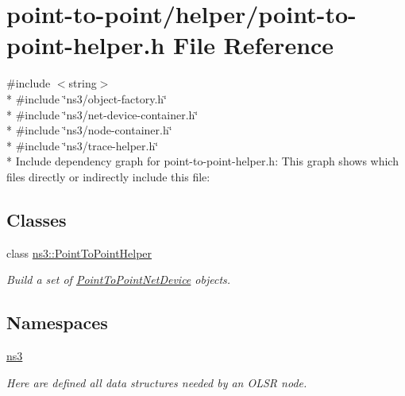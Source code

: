 \hypertarget{point-to-point-helper_8h}{}\section{point-\/to-\/point/helper/point-\/to-\/point-\/helper.h File Reference}
\label{point-to-point-helper_8h}
{\ttfamily \#include $<$string$>$}\\*
{\ttfamily \#include \char`\"{}ns3/object-\/factory.\+h\char`\"{}}\\*
{\ttfamily \#include \char`\"{}ns3/net-\/device-\/container.\+h\char`\"{}}\\*
{\ttfamily \#include \char`\"{}ns3/node-\/container.\+h\char`\"{}}\\*
{\ttfamily \#include \char`\"{}ns3/trace-\/helper.\+h\char`\"{}}\\*
Include dependency graph for point-\/to-\/point-\/helper.h\+:
This graph shows which files directly or indirectly include this file\+:
\subsection*{Classes}
\begin{DoxyCompactItemize}
\item 
class \hyperlink{classns3_1_1PointToPointHelper}{ns3\+::\+Point\+To\+Point\+Helper}
\begin{DoxyCompactList}\small\item\em Build a set of \hyperlink{classns3_1_1PointToPointNetDevice}{Point\+To\+Point\+Net\+Device} objects. \end{DoxyCompactList}\end{DoxyCompactItemize}
\subsection*{Namespaces}
\begin{DoxyCompactItemize}
\item 
 \hyperlink{namespacens3}{ns3}
\begin{DoxyCompactList}\small\item\em Here are defined all data structures needed by an O\+L\+SR node. \end{DoxyCompactList}\end{DoxyCompactItemize}
